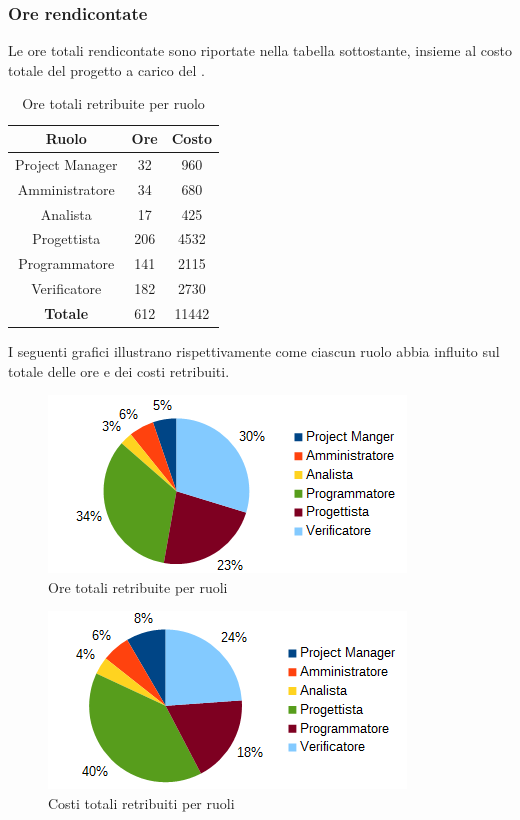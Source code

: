 		\subsubsection{Ore rendicontate}
		Le ore totali rendicontate sono riportate nella tabella sottostante, insieme al costo totale del progetto a carico del . \\
		\begin{table}[H]
		\centering
		\begin{tabular}{|c|c|c|}
			\hline
			\textbf{Ruolo}		& \textbf{Ore}	& \textbf{Costo} \\
			\hline
			Project Manager		& 32			& 960	\\
			Amministratore		& 34			& 680	\\
			Analista			& 17			& 425	\\
			Progettista			& 206			& 4532	\\
			Programmatore		& 141			& 2115	\\
			Verificatore		& 182			& 2730	\\
			\hline
			\textbf{Totale}		& 612			& 11442	\\
			\hline
		\end{tabular}
		\caption{Ore totali retribuite per ruolo}
		\end{table}
		I seguenti grafici illustrano rispettivamente come ciascun ruolo abbia influito sul totale delle ore e dei costi retribuiti. \\
		\begin{figure}[H]
		\centering
			\includegraphics[scale=1]{immagini/grafici/orario_rendicontato-torta.png}
			\caption{Ore totali retribuite per ruoli}
		\end{figure}
		\begin{figure}[H]
			\centering
			\includegraphics[scale=1]{immagini/grafici/orario_rendicontato-torta-costo.png}
			\caption{Costi totali retribuiti per ruoli}
		\end{figure}
